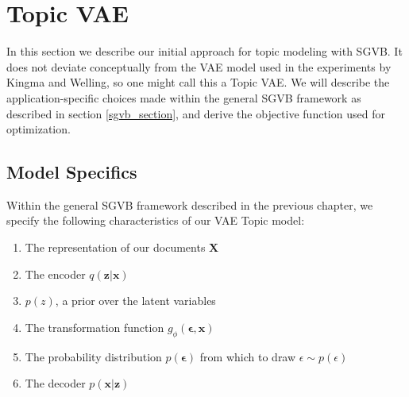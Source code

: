 \documentclass{report}
\begin{document}
\section{Topic VAE}

In this section we describe our initial approach for topic modeling with SGVB. It does not deviate conceptually from the VAE model used in the experiments by Kingma and Welling\cite{kingma2013auto}, so one might call this a Topic VAE. We will describe the application-specific choices made within the general SGVB framework as described in section \ref{sgvb_section}, and derive the objective function used for optimization. 

\subsection{Model Specifics}

Within the general SGVB framework described in the previous chapter, we specify the following characteristics of our VAE Topic model:

\begin{enumerate}
	\item The representation of our documents $\mathbf{X}$
	\item The encoder $q(\mathbf{z}|\mathbf{x})$
	\item $p(z)$, a prior  over the latent variables
	\item The transformation function $g_\phi(\boldsymbol{\epsilon},\mathbf{x})$
	\item The  probability distribution  $p(\mathbf{\epsilon})$ from which to draw $\epsilon \sim p(\epsilon)$
	\item The decoder $p(\mathbf{x}|\mathbf{z})$
\end{enumerate}
\end{document}
